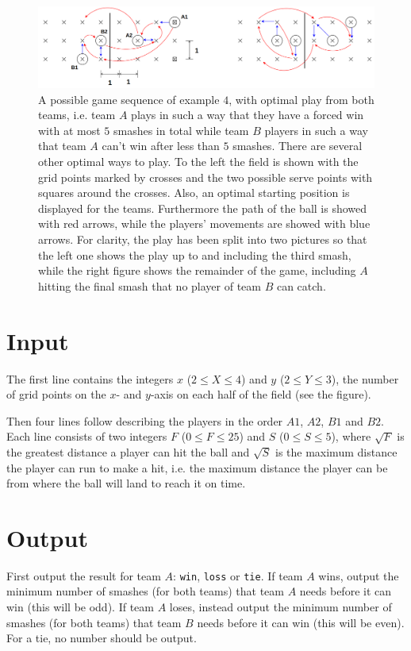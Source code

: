 \begin{figure}[h]
    \centering
    \includegraphics[width=1.0\textwidth]{grid}
    \caption{
        A possible game sequence of example $4$, with optimal play from both teams, i.e. team $A$ plays in such a way that they have a forced win with at most $5$ smashes in total while team $B$ players in such a way that team $A$ can't win after less than $5$ smashes.
        There are several other optimal ways to play.
        To the left the field is shown with the grid points marked by crosses and the two possible serve points with squares around the crosses.
        Also, an optimal starting position is displayed for the teams.
        Furthermore the path of the ball is showed with red arrows, while the players' movements are showed with blue arrows.
        For clarity, the play has been split into two pictures so that the left one shows the play up to and including the third smash, while the right figure shows the remainder of the game, including $A$ hitting the final smash that no player of team $B$ can catch.
    }
\end{figure}

\section*{Input}
The first line contains the integers $x$ ($2 \le X \le 4$) and $y$ ($2 \le Y \le 3$), the number of grid points on the $x$- and $y$-axis on each half of the field (see the figure).

Then four lines follow describing the players in the order $A1$, $A2$, $B1$ and $B2$.
Each line consists of two integers $F$ ($0 \le F \le 25$) and $S$ ($0 \le S \le 5$), where $\sqrt{F}$ is the greatest distance a player can hit the ball and $\sqrt{S}$ is the maximum distance the player can run to make a hit, i.e. the maximum distance the player can be from where the ball will land to reach it on time.

\section*{Output}
First output the result for team $A$: \texttt{win}, \texttt{loss} or \texttt{tie}.
If team $A$ wins, output the minimum number of smashes (for both teams) that team $A$ needs before it can win (this will be odd).
If team $A$ loses, instead output the minimum number of smashes (for both teams) that team $B$ needs before it can win (this will be even).
For a tie, no number should be output.

